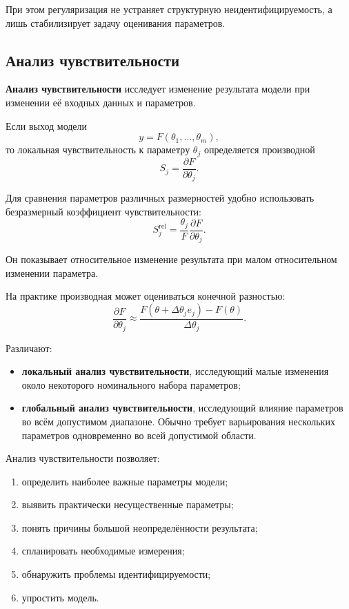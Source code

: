 При этом регуляризация не устраняет структурную неидентифицируемость, а лишь стабилизирует задачу оценивания параметров.

\subsection{Анализ чувствительности}

\textbf{Анализ чувствительности} исследует изменение результата модели при изменении её входных данных и параметров.

Если выход модели
\[
y=F(\theta_1,\ldots,\theta_m),
\]
то локальная чувствительность к параметру $\theta_j$ определяется производной
\[
S_j
=
\frac{\partial F}{\partial\theta_j}.
\]

Для сравнения параметров различных размерностей удобно использовать безразмерный коэффициент чувствительности:
\[
S_j^{\mathrm{rel}}
=
\frac{\theta_j}{F}
\frac{\partial F}{\partial\theta_j}.
\]

Он показывает относительное изменение результата при малом относительном изменении параметра.

На практике производная может оцениваться конечной разностью:
\[
\frac{\partial F}{\partial\theta_j}
\approx
\frac{
	F(\theta+\Delta\theta_j e_j)-F(\theta)
}{
	\Delta\theta_j
}.
\]

Различают:
\begin{itemize}
	\item \textbf{локальный анализ чувствительности}, исследующий малые изменения около некоторого номинального набора параметров;
	\item \textbf{глобальный анализ чувствительности}, исследующий влияние параметров во всём допустимом диапазоне. Обычно требует варьирования нескольких параметров одновременно во всей допустимой области.
\end{itemize}

Анализ чувствительности позволяет:
\begin{enumerate}
	\item определить наиболее важные параметры модели;
	\item выявить практически несущественные параметры;
	\item понять причины большой неопределённости результата;
	\item спланировать необходимые измерения;
	\item обнаружить проблемы идентифицируемости;
	\item упростить модель.
\end{enumerate}

